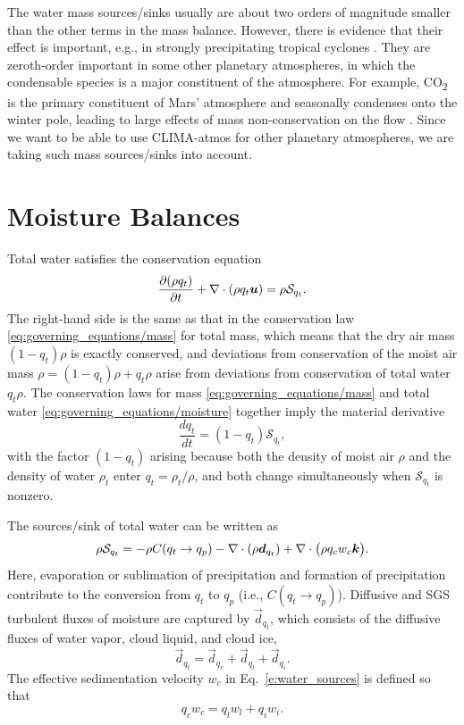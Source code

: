\documentclass{report}
\begin{document}
The water mass sources/sinks usually are about two orders of magnitude smaller than the other terms in the mass balance. However, there is evidence that their effect is important, e.g., in strongly precipitating tropical cyclones \citep{Qiu93a,Lackmann04a}. They are zeroth-order important in some other planetary atmospheres, in which the condensable species is a major constituent of the atmosphere. For example, CO\textsubscript{2} is the primary constituent of Mars' atmosphere and seasonally condenses onto the winter pole, leading to large effects of mass non-conservation on the flow \cite[e.g.,][]{Soto15a}. Since we want to be able to use CLIMA-atmos for other planetary atmospheres, we are taking such mass sources/sinks into account.

\section{Moisture Balances}\label{s:moisture_balance}

Total water satisfies the conservation equation
\begin{equation}
\frac{\partial (\rho q_t)}{\partial t} + \nabla \cdot (\rho q_t \boldsymbol{{u}}) = \rho \mathcal{S}_{q_t}.   
\label{eq:governing_equations/moisture}
\end{equation}
The right-hand side is the same as that in the conservation law \eqref{eq:governing_equations/mass} for total mass, which means that the dry air mass $(1-q_t)\rho$ is exactly conserved, and deviations from conservation of the moist air mass $\rho = (1-q_t)\rho + q_t \rho$ arise from deviations from conservation of total water $q_t\rho$. The conservation laws for mass \eqref{eq:governing_equations/mass} and total water \eqref{eq:governing_equations/moisture} together imply the material derivative 
\[
\frac{dq_t}{dt} = (1-q_t) \mathcal{S}_{q_t},
\]
with the factor $(1-q_t)$ arising because both the density of moist air $\rho$ and the density of water $\rho_t$ enter $q_t = \rho_t/\rho$, and both change simultaneously when $\mathcal{S}_{q_t}$ is nonzero.

The sources/sink of total water can be written as 
\begin{equation}\label{e:water_sources}
     \rho \mathcal{S}_{q_t} = - \rho C(q_t \rightarrow q_p) - \nabla \cdot (\rho \boldsymbol{{d}}_{q_t}) + \nabla \cdot \bigl(\rho q_c w_c \boldsymbol{{k}}  \bigr).
\end{equation}
Here, evaporation or sublimation of precipitation and formation of precipitation contribute to the conversion from $q_t$ to $q_p$ (i.e., $C(q_t \rightarrow q_p)$). Diffusive and SGS turbulent fluxes of moisture are captured by $\vec{d}_{q_t}$, which consists of the diffusive fluxes of water vapor, cloud liquid, and cloud ice, 
\begin{equation}
    \vec{d}_{q_t} =\vec{d}_{q_v} + \vec{d}_{q_l} + \vec{d}_{q_i}.
\end{equation}
The effective sedimentation velocity $w_c$ in Eq.~\eqref{e:water_sources} is defined so that 
\begin{equation}
    q_c w_c = q_l w_l + q_i w_i.
\end{equation}
\end{document}
